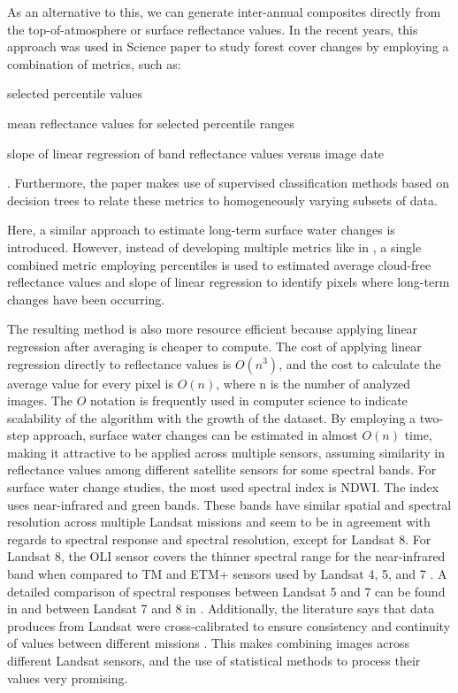 As an alternative to this, we can generate inter-annual composites directly from the top-of-atmosphere or surface reflectance values. In the recent years, this approach was used in Science paper \citet{Hansen2013} to study forest cover changes by employing a combination of metrics, such as: 
\begin{enumerate*}[label=(\emph{\alph*})]
	\item selected percentile values
	\item mean reflectance values for selected percentile ranges
	\item slope of linear regression of band reflectance values versus image date
\end{enumerate*}. Furthermore, the paper makes use of supervised classification methods based on decision trees to relate these metrics to homogeneously varying subsets of data.

Here, a similar approach to estimate long-term surface water changes is introduced. However, instead of developing multiple metrics like in \citet{Hansen2013}, a single combined metric employing percentiles is used to estimated average cloud-free reflectance values and slope of linear regression to identify pixels where long-term changes have been occurring. 

The resulting method is also more resource efficient because applying linear regression after averaging is cheaper to compute. The cost of applying linear regression directly to reflectance values is $O(n^3)$, and the cost to calculate the average value for every pixel is $O(n)$, where n is the number of analyzed images. The $O$ notation is frequently used in computer science to indicate scalability of the algorithm with the growth of the dataset. By employing a two-step approach, surface water changes can be estimated in almost $O(n)$ time, making it attractive to be applied across multiple sensors, assuming similarity in reflectance values among different satellite sensors for some spectral bands. For surface water change studies, the most used spectral index is NDWI. The index uses near-infrared and green bands. These bands have similar spatial and spectral resolution across multiple Landsat missions and seem to be in agreement with regards to spectral response and spectral resolution, except for Landsat 8. For Landsat 8, the OLI sensor covers the thinner spectral range for the near-infrared band when compared to TM and ETM+ sensors used by Landsat 4, 5, and 7 \citet{roy2016characterization, angal2014cross}. A detailed comparison of spectral responses between Landsat 5 and 7 can be found in \citet{teillet2001radiometric} and between Landsat 7 and 8 in \citet{flood2014continuity}. Additionally, the literature says that data produces from Landsat were cross-calibrated to ensure consistency and continuity of values between different missions \citet{mishra2014radiometric}. This makes combining images across different Landsat sensors, and the use of statistical methods to process their values very promising.

